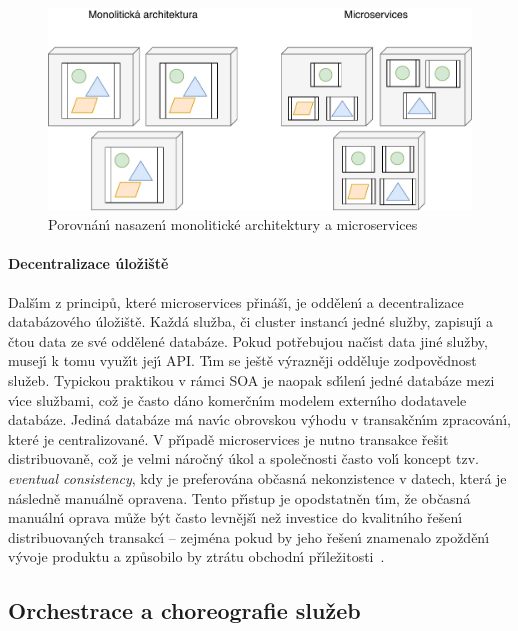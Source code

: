 \begin{figure}
    \centering
    \includegraphics[keepaspectratio=true, width=0.8\linewidth]{figures/microservices-deployment.pdf}
    \caption{Porovnán\'{\i} nasazen\'{\i} monolitické architektury a microservices}
    \label{fig:microservices-deployment}
\end{figure}

\paragraph{Decentralizace úložiště}
Dalš\'{\i}m z principů, které microservices přináš\'{\i}, je oddělen\'{\i} a decentralizace
databázového úložiště. Každá služba, či cluster instanc\'{\i} jedné služby, zapisuj\'{\i}
a čtou data ze své oddělené databáze. Pokud potřebujou nač\'{\i}st data jiné služby,
musej\'{\i} k tomu využ\'{\i}t jej\'{\i} \gls{API}. T\'{\i}m se ještě v\'yrazněji odděluje zodpovědnost služeb.
Typickou praktikou v rámci \gls{SOA} je naopak sd\'{\i}len\'{\i} jedné databáze mezi v\'{\i}ce službami,
což je často dáno komerčn\'{\i}m modelem extern\'{\i}ho dodatavele databáze. Jediná databáze
má nav\'{\i}c obrovskou v\'yhodu v transakčn\'{\i}m zpracován\'{\i}, které je centralizované.
V př\'{\i}padě microservices je nutno transakce řešit distribuovaně, což je velmi náročn\'y
úkol a společnosti často vol\'{\i} koncept tzv. \textit{eventual consistency}, kdy je
preferována občasná nekonzistence v datech, která je následně manuálně opravena.
Tento př\'{\i}stup je opodstatněn t\'{\i}m, že občasná manuáln\'{\i} oprava může b\'yt
často levnějš\'{\i} než investice do kvalitn\'{\i}ho řešen\'{\i} distribuovan\'ych transakc\'{\i} –
zejména pokud by jeho řešen\'{\i} znamenalo zpožděn\'{\i} v\'yvoje produktu a způsobilo
by ztrátu obchodn\'{\i} př\'{\i}ležitosti~\cite{lewis2014microservices}.

\subsection{Orchestrace a choreografie služeb}

